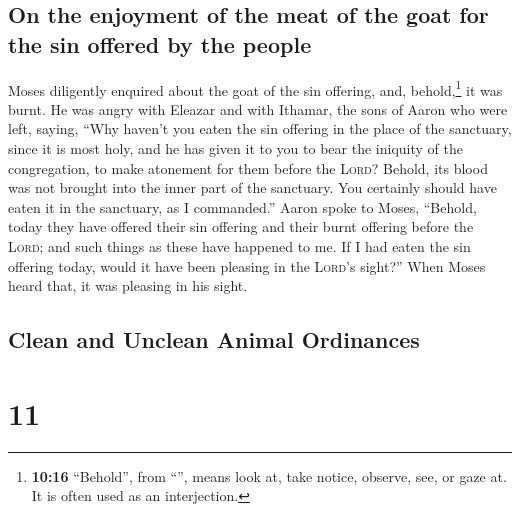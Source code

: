 \hypertarget{on-the-enjoyment-of-the-meat-of-the-goat-for-the-sin-offered-by-the-people}{%
\subsection{On the enjoyment of the meat of the goat for the sin offered
by the
people}\label{on-the-enjoyment-of-the-meat-of-the-goat-for-the-sin-offered-by-the-people}}

 Moses diligently enquired about the goat of the sin
offering, and, behold,\footnote{\textbf{10:16} ``Behold'', from
  ``'', means look at, take notice, observe, see, or gaze
  at. It is often used as an interjection.} it was burnt. He was angry
with Eleazar and with Ithamar, the sons of Aaron who were left, saying,
 ``Why haven't you eaten the sin offering in the place of
the sanctuary, since it is most holy, and he has given it to you to bear
the iniquity of the congregation, to make atonement for them before the
\textsc{Lord}?  Behold, its blood was not brought into
the inner part of the sanctuary. You certainly should have eaten it in
the sanctuary, as I commanded.''  Aaron spoke to Moses,
``Behold, today they have offered their sin offering and their burnt
offering before the \textsc{Lord}; and such things as these have
happened to me. If I had eaten the sin offering today, would it have
been pleasing in the \textsc{Lord}'s sight?''  When Moses
heard that, it was pleasing in his sight.

\hypertarget{clean-and-unclean-animal-ordinances}{%
\subsection{Clean and Unclean Animal
Ordinances}\label{clean-and-unclean-animal-ordinances}}

\hypertarget{section-10}{%
\section{11}\label{section-10}}

